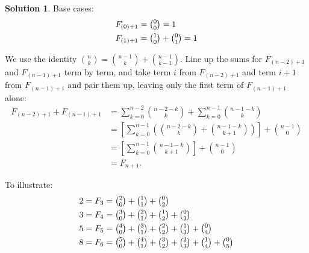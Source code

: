 \documentclass[11pt]{article}
\theoremstyle{definition}
\newtheorem*{solution}{Solution}
\begin{document}
\begin{solution}
Base cases:
\begin{align*}
  F_{(0)+1} &= \tbinom{0}{0} = 1 \\
  F_{(1)+1} &= \tbinom{1}{0} + \tbinom{0}{1} = 1
\end{align*}

We use the identity $\binom{n}{k} = \binom{n-1}{k} + \binom{n-1}{k-1}$. Line up the
sums for $F_{(n-2)+1}$ and $F_{(n-1)+1}$ term by term, and take term $i$ from
$F_{(n-2)+1}$ and term $i+1$ from $F_{(n-1)+1}$ and pair them up, leaving only the
first term of $F_{(n-1)+1}$ alone:
\begin{align*}
  F_{(n-2)+1} + F_{(n-1)+1}
  &= \sum_{k=0}^{n-2}\binom{n-2-k}{k} + \sum_{k=0}^{n-1}\binom{n-1-k}{k} \\
  &= \left[\sum_{k=0}^{n-1}\left(\binom{n-2-k}{k} + \binom{n-1-k}{k+1}\right)\right]
     + \binom{n-1}{0} \\
  &= \left[\sum_{k=0}^{n-1}\binom{n-1-k}{k+1}\right] + \binom{n-1}{0} \\
  &= F_{n+1}.
\end{align*}


To illustrate:
\begin{align*}
  2 = F_3 &= \tbinom{2}{0} + \tbinom{1}{1} + \tbinom{0}{2} \\
  3 = F_4 &= \tbinom{3}{0} + \tbinom{2}{1} + \tbinom{1}{2} + \tbinom{0}{3} \\
  5 = F_5 &= \tbinom{4}{0} + \tbinom{3}{1} + \tbinom{2}{2} + \tbinom{1}{3} + \tbinom{0}{4} \\
  8 = F_6 &= \tbinom{5}{0} + \tbinom{4}{1} + \tbinom{3}{2} + \tbinom{2}{3}
             + \tbinom{1}{4} + \tbinom{0}{5}
\end{align*}
\end{solution}
\end{document}

